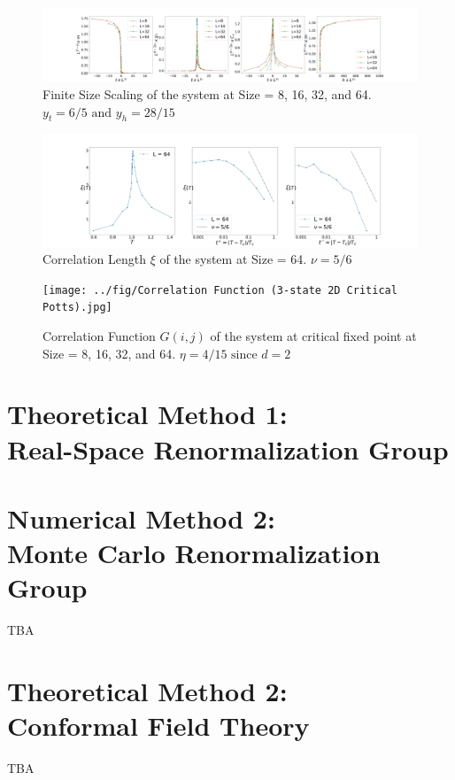 \documentclass[%
 reprint,
 amsmath,amssymb,
 aps,
]{revtex4-2}
\begin{document}
\begin{figure}[b]
\includegraphics[width=1\textwidth]{../fig/Finite Size Scaling (3-state 2D Potts).jpg}
\caption{\label{fig:fss} Finite Size Scaling of the system at Size = 8, 16, 32, and 64. 
$y_{t} = 6/5 \text{ and } y_{h} = 28/15$}
\end{figure}

\begin{figure}[b]
\includegraphics[width=1\textwidth]{../fig/Correlation Length (3-state 2D Potts).jpg}
\caption{\label{fig:corrlength} Correlation Length $\xi$ of the system at Size = 64. 
$\nu = 5/6$}
\end{figure}

\begin{figure}[b]
\texttt{[image: ../fig/Correlation Function (3-state 2D Critical 
Potts).jpg]}
\caption{\label{fig:corrfunc} Correlation Function $G(i,j)$ of the system at critical 
fixed point at Size = 8, 16, 32, and 64. $\eta = 4/15 \text{ since } d = 2$}
\end{figure}

\section{\label{sec:rsrg}Theoretical Method 1: \\ Real-Space Renormalization Group}


\section{\label{sec:mcrg}Numerical Method 2: \\ Monte Carlo Renormalization Group}
TBA

\section{\label{sec:cft}Theoretical Method 2: \\ Conformal Field Theory}
TBA
\end{document}
